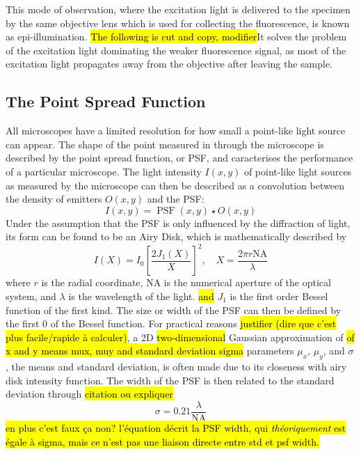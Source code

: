 This mode of observation, where the excitation light is delivered to the specimen by the same objective lens which is used for collecting the fluorescence, 
is known as epi-illumination.
\hl{The following is cut and copy, modifier}It solves the problem of the excitation light dominating the weaker fluorescence signal, as most of the excitation light propagates away from the objective after leaving  the sample.



\subsection{The Point Spread Function}
All microscopes have a limited resolution for how small a point-like light source can appear. The shape of the point measured in through the microscope is described by the point spread function, or PSF, and caracterises the performance of a particular microscope. The light intensity $I(x, y)$ of point-like light sources as measured by the microscope can then be described as a convolution between the density of emitters $O(x, y)$ and the PSF:
\begin{equation}
    I(x, y) = \operatorname{PSF}(x, y) \star O(x, y)
\end{equation}
Under the assumption that the PSF is only influenced by the diffraction of light, its form can be found to be an Airy Disk, which is mathematically described by
\begin{equation}
    I(X) = I_0 \left[ \frac{2 J_1(X)}{X} \right]^{2}, \quad X = \frac{2\pi r \textrm{NA}}{\lambda}
\end{equation}
where $r$ is the radial coordinate, NA is the numerical aperture of the optical system, and $\lambda$ is the wavelength of the light. \hl{and} $J_1$ is the first order Bessel function of the first kind. The size or width of the PSF can then be defined by the first $0$ of the Bessel function.
For practical reasons \hl{justifier (dire que c'est plus facile/rapide à calculer)}, a 2D \hl{two-dimensional} Gaussian approximation of \hl{of x and y means mux, muy and standard deviation sigma} parameters $\mu_x$, $\mu_y$, and $\sigma$, the means and standard deviation, is often made due to its closeness with airy disk intensity function. The width of the PSF is then related to the standard deviation through \hl{citation ou expliquer}
\begin{equation}
    \sigma = 0.21 \frac{\lambda}{\textrm{NA}}
    \label{eq:PSF_width_gaussian}
\end{equation}
\hl{en plus c'est faux ça non? l'équation décrit la PSF width, qui \emph{théoriquement} est égale à sigma, mais ce n'est pas une liaison directe entre std et psf width.}

